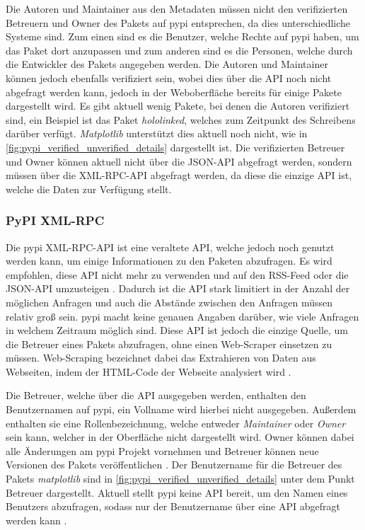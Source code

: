 Die Autoren und Maintainer aus den Metadaten müssen nicht den verifizierten Betreuern und Owner des Pakets auf \gls{pypi} entsprechen, da dies unterschiedliche Systeme sind.
Zum einen sind es die Benutzer, welche Rechte auf \gls{pypi} haben, um das Paket dort anzupassen und zum anderen sind es die Personen, welche durch die Entwickler des Pakets angegeben werden.
Die Autoren und Maintainer können jedoch ebenfalls verifiziert sein, wobei dies über die API noch nicht abgefragt werden kann, jedoch in der Weboberfläche bereits für einige Pakete dargestellt wird.
Es gibt aktuell wenig Pakete, bei denen die Autoren verifiziert sind, ein Beispiel ist das Paket \emph{hololinked}, welches zum Zeitpunkt des Schreibens darüber verfügt.
\emph{Matplotlib} unterstützt dies aktuell noch nicht, wie in \autoref{fig:pypi_verified_unverified_details} dargestellt ist.
Die verifizierten Betreuer und Owner können aktuell nicht über die JSON-API abgefragt werden, sondern müssen über die XML-RPC-API abgefragt werden, da diese die einzige API ist, welche die Daten zur Verfügung stellt.

\subsubsection*{PyPI XML-RPC}
\label{subsubsec:pypi_xml_rpc}
Die \gls{pypi} XML-RPC-API ist eine veraltete API, welche jedoch noch genutzt werden kann, um einige Informationen zu den Paketen abzufragen.
Es wird empfohlen, diese API nicht mehr zu verwenden und auf den RSS-Feed oder die JSON-API umzusteigen \autocite{python_software_foundation_warehouse_2024}.
Dadurch ist die API stark limitiert in der Anzahl der möglichen Anfragen und auch die Abstände zwischen den Anfragen müssen relativ groß sein.
\gls{pypi} macht keine genauen Angaben darüber, wie viele Anfragen in welchem Zeitraum möglich sind.
Diese API ist jedoch die einzige Quelle, um die Betreuer eines Pakets abzufragen, ohne einen Web-Scraper einsetzen zu müssen.
Web-Scraping bezeichnet dabei das Extrahieren von Daten aus Webseiten, indem der HTML-Code der Webseite analysiert wird \autocite{richardson_beautifulsoup4_2024}.

Die Betreuer, welche über die API ausgegeben werden, enthalten den Benutzernamen auf \gls{pypi}, ein Vollname wird hierbei nicht ausgegeben.
Außerdem enthalten sie eine Rollenbezeichnung, welche entweder \emph{Maintainer} oder \emph{Owner} sein kann, welcher in der Oberfläche nicht dargestellt wird.
Owner können dabei alle Änderungen am \gls{pypi} Projekt vornehmen und Betreuer können neue Versionen des Pakets veröffentlichen \autocite{ingram_deprecate_2023}.
Der Benutzername für die Betreuer des Pakets \emph{matplotlib} sind in \autoref{fig:pypi_verified_unverified_details} unter dem Punkt \glqq Betreuer\grqq{} dargestellt.
Aktuell stellt \gls{pypi} keine API bereit, um den Namen eines Benutzers abzufragen, sodass nur der Benutzername über eine API abgefragt werden kann \autocite{python_software_foundation_add_2024}.

